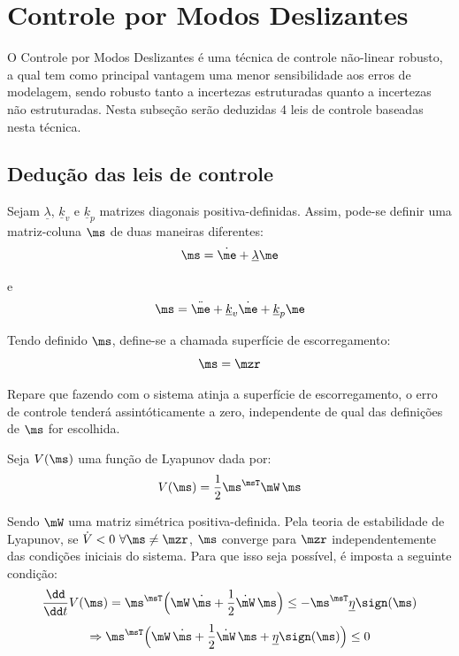 \documentclass[]{politex}
\begin{document}
\section{Controle por Modos Deslizantes}\label{S05-04-03}

O Controle por Modos Deslizantes é uma técnica de controle não-linear robusto, a qual tem como principal vantagem uma menor sensibilidade aos erros de modelagem, sendo robusto tanto a incertezas estruturadas quanto a incertezas não estruturadas. Nesta subseção serão deduzidas 4 leis de controle baseadas nesta técnica.

\subsection{Dedução das leis de controle}\label{S05-04-03-01}

Sejam $\underline{\lambda}$, $\underline{k}_v$ e $\underline{k}_p$ matrizes diagonais positiva-definidas. Assim, pode-se definir uma matriz-coluna $\ms$ de duas maneiras diferentes:
\begin{equation} \label{eq:SlidingSurfaces}
\ms = \dot{\me} + \underline{\lambda}\me
\end{equation}

e
\begin{equation} \label{eq:SlidingSurfaces_}
\ms = \ddot{\me} + \underline{k}_v\dot{\me} + \underline{k}_p\me
\end{equation}

Tendo definido $\ms$, define-se a chamada superfície de escorregamento:
\begin{equation} \label{eq:SuperficieDeEscorregamento}
\ms = \mzr
\end{equation}

Repare que fazendo com o sistema atinja a superfície de escorregamento, o erro de controle tenderá assintóticamente a zero, independente de qual das definições de $\ms$ for escolhida.
 
Seja $V(\ms)$ uma função de Lyapunov dada por:
\begin{equation}
V(\ms) = \frac{1}{2} \ms^\msT \mW \, \ms
\end{equation}

Sendo $\mW$ uma matriz simétrica positiva-definida. Pela teoria de estabilidade de Lyapunov, se $\dot{V} < 0 \,\, \forall \ms \neq \mzr$, $\ms$ converge para $\mzr$ independentemente das condi\c{c}\~oes iniciais do sistema. Para que isso seja poss\'ivel, \'e imposta a seguinte condi\c{c}\~ao:
\begin{equation} \label{eq:SlidingCondition}
\frac{\dd}{\dd t} V(\ms) = \ms^\msT \Big( \mW \, \dot{\ms} + \frac{1}{2}  \dot{\mW} \, \ms \Big) \leq -   \ms^\msT \underline{\eta} \sign(\ms) 
\end{equation}
\begin{equation}
\Rightarrow \ms^\msT \Big( \mW \, \dot{\ms} + \frac{1}{2}  \dot{\mW} \, \ms + \underline{\eta} \sign(\ms)  \Big) \leq 0
\end{equation}
\end{document}

